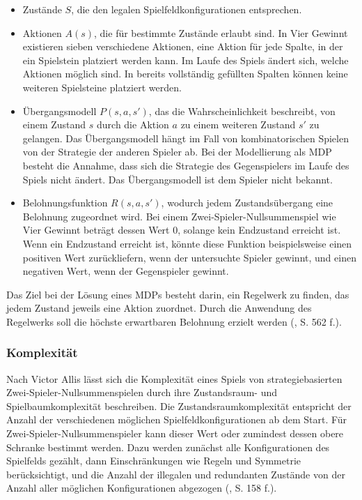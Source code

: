 \begin{itemize}
	
\item Zustände $S$, die den legalen Spielfeldkonfigurationen entsprechen.
\item Aktionen $A(s)$, die für bestimmte Zustände erlaubt sind. In Vier Gewinnt existieren sieben verschiedene Aktionen, eine Aktion für jede Spalte, in der ein Spielstein platziert werden kann. Im Laufe des Spiels ändert sich, welche Aktionen möglich sind. In bereits vollständig gefüllten Spalten können keine weiteren Spielsteine platziert werden.
\item Übergangsmodell $P(s, a, s')$, das die Wahrscheinlichkeit beschreibt, von einem Zustand $s$ durch die Aktion $a$ zu einem weiteren Zustand $s'$ zu gelangen. Das Übergangsmodell hängt im Fall von kombinatorischen Spielen von der Strategie der anderen Spieler ab. Bei der Modellierung als MDP besteht die Annahme, dass sich die Strategie des Gegenspielers im Laufe des Spiels nicht ändert. Das Übergangsmodell ist dem Spieler nicht bekannt.
\item Belohnungsfunktion $R(s, a, s')$, wodurch jedem Zustandsübergang eine Belohnung zugeordnet wird. Bei einem Zwei-Spieler-Nullsummenspiel wie Vier Gewinnt beträgt dessen Wert 0, solange kein Endzustand erreicht ist. Wenn ein Endzustand erreicht ist, könnte diese Funktion beispielsweise einen positiven Wert zurückliefern, wenn der untersuchte Spieler gewinnt, und einen negativen Wert, wenn der Gegenspieler gewinnt.

\end{itemize}

Das Ziel bei der Lösung eines MDPs besteht darin, ein Regelwerk zu finden, das jedem Zustand jeweils eine Aktion zuordnet. Durch die Anwendung des Regelwerks soll die höchste erwartbaren Belohnung erzielt werden (\cite{Russell.2020}, S. 562 f.).

\subsubsection{Komplexität}

Nach Victor Allis lässt sich die Komplexität eines Spiels von strategiebasierten Zwei-Spieler-Nullsummenspielen durch ihre Zustandsraum- und Spielbaumkomplexität beschreiben. Die Zustandsraumkomplexität entspricht der Anzahl der verschiedenen möglichen Spielfeldkonfigurationen ab dem Start. Für Zwei-Spieler-Nullsummenspieler kann dieser Wert oder zumindest dessen obere Schranke bestimmt werden. Dazu werden zunächst alle Konfigurationen des Spielfelds gezählt, dann Einschränkungen wie Regeln und Symmetrie berücksichtigt, und die Anzahl der illegalen und redundanten Zustände von der Anzahl aller möglichen Konfigurationen abgezogen (\cite{Allis.1994}, S. 158 f.).

